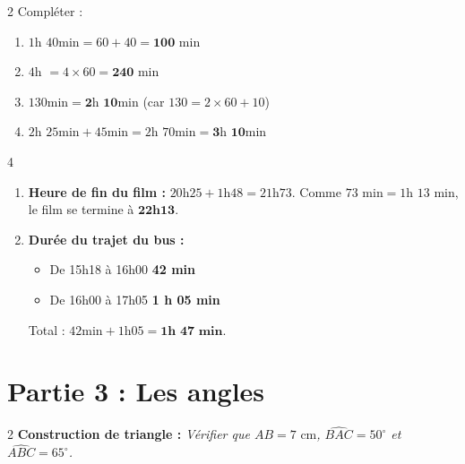 \documentclass[a4paper]{book}
\begin{document}
{        
    \begin{exerciceNote}{2}
        Compléter :
        \begin{enumerate}
            \item $1\text{h } 40\text{min} = 60 + 40 = \mathbf{100} \text{ min}$
            \item $4\text{h } = 4 \times 60 = \mathbf{240} \text{ min}$
            \item $130\text{min} = \mathbf{2}\text{h } \mathbf{10}\text{min}$ \quad (car $130 = 2 \times 60 + 10$)
            \item $2\text{h } 25\text{min} + 45\text{min} = 2\text{h } 70\text{min} = \mathbf{3}\text{h } \mathbf{10}\text{min}$
        \end{enumerate}
    \end{exerciceNote}
    
        
    \begin{exerciceNote}{4}
        \begin{enumerate}[leftmargin=*]
            \item \textbf{Heure de fin du film :} \newline
            $20\text{h}25 + 1\text{h}48 = 21\text{h}73$. \newline
            Comme $73\text{ min} = 1\text{h } 13\text{ min}$, le film se termine à $\mathbf{22\text{h}13}$.
            
            \item \textbf{Durée du trajet du bus :}
            \begin{itemize}
                \item De 15h18 à 16h00 \textrightarrow{} \textbf{42 min}
                \item De 16h00 à 17h05 \textrightarrow{} \textbf{1 h 05 min}
            \end{itemize}
            Total : $42\text{min} + 1\text{h}05 = \mathbf{1\text{h } 47\text{ min}}$.
        \end{enumerate}
    \end{exerciceNote}
    
    
\section*{Partie 3 : Les angles}
    
        
    \begin{exerciceNote}{2}
        \textbf{Construction de triangle :} \textit{Vérifier que $AB = 7\text{ cm}$, $\widehat{BAC} = 50^\circ$ et $\widehat{ABC} = 65^\circ$.}


\end{exerciceNote}}
\end{document}
